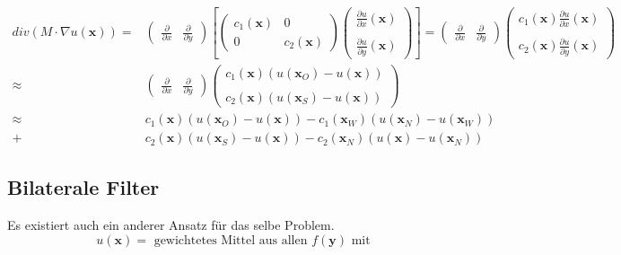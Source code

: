 \documentclass[ngerman]{article}
\theoremstyle{plain}
\theoremstyle{definition}
\numberwithin{equation}{section}
\newcommand{\x}[0] {
  \boldsymbol{x}
}
\newcommand{\y}[0] {
    \boldsymbol{y}
}
\begin{document}
\begin{enumerate}[label=\alph*)]
        \begin{align*}div(M \cdot \nabla u(\x)) =& \begin{pmatrix}
            \frac{\partial}{\partial x} & \frac{\partial}{\partial y}
        \end{pmatrix}
        \left[ \begin{pmatrix}
        c_1(\x) & 0\\
        0 & c_2(\x)
        \end{pmatrix}
        \begin{pmatrix}
            \frac{\partial u}{\partial x} (\x)\\
            \ \\
            \frac{\partial u}{\partial y} (\x)
        \end{pmatrix}
        \right]
        = \begin{pmatrix}
        \frac{\partial}{\partial x} & \frac{\partial}{\partial y}
        \end{pmatrix}
        \begin{pmatrix}
            c_1(\x) \frac{\partial u}{\partial x} (\x)\\
            \ \\
            c_2(\x) \frac{\partial u}{\partial y} (\x)
        \end{pmatrix}\\
        \approx & \begin{pmatrix}
        \frac{\partial}{\partial x} & \frac{\partial}{\partial y}
        \end{pmatrix}
        \begin{pmatrix}
            c_1(\x) (u(\x_O) - u(\x)) \\
            \ \\
            c_2(\x) (u(\x_S) - u(\x))
        \end{pmatrix}\\
        \approx & c_1(\x) (u(\x_O) - u(\x)) - c_1(\x_W)(u(\x_N) - u(\x_W))\\
        +&c_2(\x) (u(\x_S) - u(\x)) - c_2(\x_N)(u(\x) - u(\x_N))
        \end{align*}
      \end{enumerate}

      \subsection{Bilaterale Filter}
      Es existiert auch ein anderer Ansatz für das selbe Problem.
      \[u(\x) = \text{ gewichtetes Mittel aus allen } f(\y) \text{ mit}\]
\end{document}
